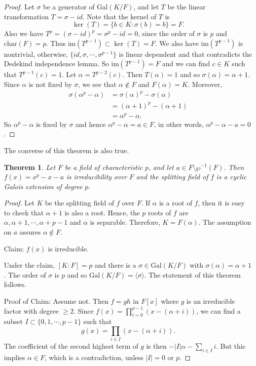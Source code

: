 \documentclass[12pt]{report}
\newtheorem{theorem}{Theorem}[section]
\theoremstyle{definition}
\newcommand{\charr}{\text{char}}
\newcommand{\Gal}{\text{Gal}}
\newcommand{\im}{\text{im}}
\begin{document}
\begin{proof}
	Let $\sigma$ be a generator of $\Gal(K/F)$, and let $T$ be the linear transformation $T=\sigma-id$. Note that the kernel of $T$ is $$\ker(T)=\{b\in K: \sigma(b)=b\}=F.$$ Also we have $T^p=(\sigma-id)^p=\sigma^p-id=0$, since the order of $\sigma$ is $p$ and $\charr(F)=p$. Thus $\im(T^{p-1})\subset \ker(T)=F$. We also have $\im(T^{p-1})$ is nontrivial, otherwise, $\{id,\sigma,\cdots,\sigma^{p-1}\}$ is linear dependent and that contradicts the Dedekind independence lemma. So $\im(T^{p-1})=F$ and we can find $c\in K$ such that $T^{p-1}(c)=1$. Let $\alpha=T^{p-2}(c)$. Then $T(\alpha)=1$ and so $\sigma(\alpha)=\alpha+1$. Since $\alpha$ is not fixed by $\sigma$, we see that $\alpha\notin F$ and $F(\alpha)=K$. Moreover, \begin{align*}
		\sigma(\alpha^p -\alpha) & =\sigma(\alpha)^p-\sigma(\alpha) \\
		                         & = (\alpha+1)^p-(\alpha+1)        \\
		                         & =\alpha^p-\alpha.
	\end{align*}
	So $\alpha^p-\alpha$ is fixed by $\sigma$ and hence $\alpha^p-\alpha=a\in F$, in other words, $\alpha^p-\alpha-a=0$.
\end{proof}

The converse of this theorem is also true.

\begin{theorem}\label{as1}
	Let $F$ be a field of characteristic $p$, and let $a\in F\setminus\wp^{-1}(F)$. Then $f(x)=x^p-x-a$ is irreducibility over $F$ and the splitting field of $f$ is a cyclic Galois extension of degree $p$.
\end{theorem}

\begin{proof}
	Let $K$ be the splitting field of $f$ over $F$. If $\alpha$ is a root of $f$, then it is easy to check that $\alpha+1$ is also a root. Hence, the $p$ roots of $f$ are $\alpha,\alpha+1,\cdots,\alpha+p-1$ and $\alpha$ is separable. Therefore, $K=F(\alpha)$. The assumption on $a$ assures $\alpha\notin F$.

	Claim: $f(x)$ is irreducible.

	Under the claim, $[K:F]=p$ and there is a $\sigma\in \Gal(K/F)$ with $\sigma(\alpha)=\alpha+1$. The order of $\sigma$ is $p$ and so $\Gal(K/F)=\langle \sigma\rangle$. The statement of this theorem follows.

	Proof of Claim: Assume not. Then $f=gh$ in $F[x]$ where $g$ is an irreducible factor with degree $\geq 2$. Since $f(x)=\prod_{i=0}^{p-1}(x-(\alpha+i))$, we can find a subset $I\subset\{0,1,\cdots,p-1\}$ such that $$g(x)=\prod_{i\in I}(x-(\alpha+i)).$$ The coefficient of the second highest term of $g$ is then $-|I|\alpha-\sum_{i\in I}i$. But this implies $\alpha\in F$, which is a contradiction, unless $|I|=0$ or $p$.
\end{proof}
\end{document}
